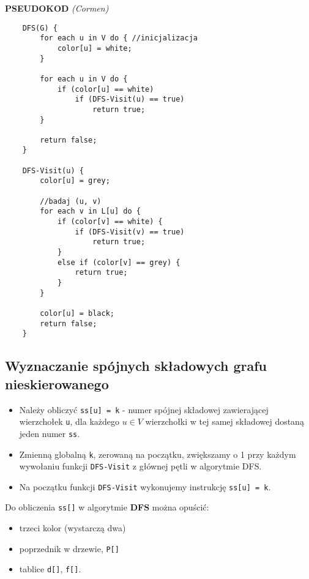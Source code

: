 \documentclass[algorytmy.tex]{subfiles}
\begin{document}
    \textbf{PSEUDOKOD} \textit{(Cormen)}
    \begin{verbatim}
    DFS(G) {
        for each u in V do { //inicjalizacja
            color[u] = white;
        }

        for each u in V do {
            if (color[u] == white)
                if (DFS-Visit(u) == true)
                    return true;
        }

        return false;
    }

    DFS-Visit(u) {
        color[u] = grey;

        //badaj (u, v)
        for each v in L[u] do {
            if (color[v] == white) {
                if (DFS-Visit(v) == true)
                    return true;
            }
            else if (color[v] == grey) {
                return true;
            }
        }

        color[u] = black;
        return false;
    }
    \end{verbatim}

\pagebreak


\subsection{Wyznaczanie spójnych składowych grafu nieskierowanego}
\begin{itemize}
    \item Należy obliczyć \texttt{ss[u] = k} - numer spójnej składowej
    zawierającej wierzchołek \texttt{u}, dla każdego $u \in V$ wierzchołki w tej
    samej składowej dostaną jeden numer \texttt{ss}.
    \item Zmienną globalną \texttt{k}, zerowaną na początku, zwiększamy o 1 przy
    każdym wywołaniu funkcji \texttt{DFS-Visit} z głównej pętli w algorytmie
    DFS.
    \item Na początku funkcji \texttt{DFS-Visit} wykonujemy instrukcję
    \texttt{ss[u] = k}.
\end{itemize}

Do obliczenia \texttt{ss[]} w algorytmie \textbf{DFS} można opuścić:
\begin{itemize}
    \item trzeci kolor (wystarczą dwa)
    \item poprzednik w drzewie, \texttt{P[]}
    \item tablice \texttt{d[]}, \texttt{f[]}.
\end{itemize}
\end{document}
